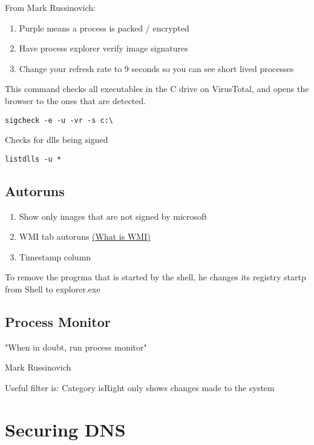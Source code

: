 \documentclass{article}
\begin{document}
From Mark Russinovich:
\begin{enumerate}
        \item Purple means a process is packed / encrypted
        \item Have process explorer verify image signatures
        \item Change your refresh rate to 9 seconds so you can see short lived processes
\end{enumerate}

This command checks all executables in the C drive on VirusTotal,
 and opens the browser to the ones that are detected.
\begin{lstlisting}[breaklines=true, columns=fullflexible]
        sigcheck -e -u -vr -s c:\       
\end{lstlisting}

Checks for dlls being signed
\begin{lstlisting}[breaklines=true, columns=fullflexible]
        listdlls -u *       
\end{lstlisting}

\subsection{Autoruns}

\begin{enumerate}
        \item Show only images that are not signed by microsoft
        \item WMI tab autoruns \href{https://medium.com/threatpunter/detecting-removing-wmi-persistence-60ccbb7dff96}{(What is WMI)}
        \item Timestamp column
\end{enumerate}

To remove the progrma that is started by the shell, he changes its registry startp from 
Shell to explorer.exe

\subsection{Process Monitor}
\epigraph{"When in doubt, run process monitor"}{Mark Russinovich}

Useful filter is:
Category isRight only shows changes made to the system


\section{Securing DNS}
\end{document}
